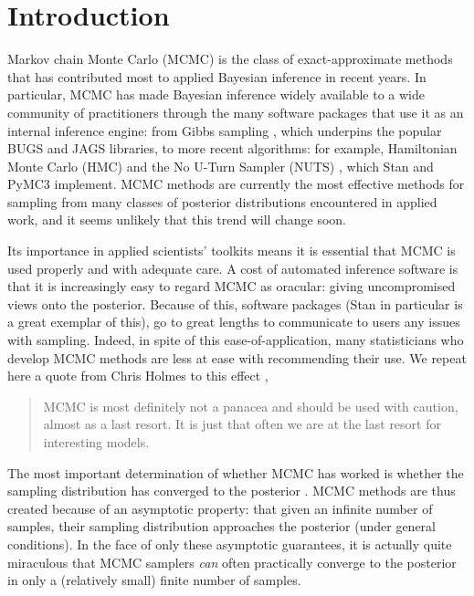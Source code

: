 \documentclass{article}
\begin{document}
\section{Introduction}
Markov chain Monte Carlo (MCMC) is the class of exact-approximate methods that has contributed most to applied Bayesian inference in recent years. In particular, MCMC has made Bayesian inference widely available to a wide community of practitioners through the many software packages that use it as an internal inference engine: from Gibbs sampling \cite{geman1984stochastic}, which underpins the popular BUGS \cite{lunn2000winbugs} and JAGS \cite{plummer2003jags} libraries, to more recent algorithms: for example, Hamiltonian Monte Carlo (HMC) \cite{neal2011mcmc} and the No U-Turn Sampler (NUTS) \cite{hoffman2014no}, which Stan \cite{carpenter2017stan} and PyMC3 \cite{salvatier2016probabilistic} implement. MCMC methods are currently the most effective methods for sampling from many classes of posterior distributions encountered in applied work, and it seems unlikely that this trend will change soon.

Its importance in applied scientists' toolkits means it is essential that MCMC is used properly and with adequate care. A cost of automated inference software is that it is increasingly easy to regard MCMC as oracular: giving uncompromised views onto the posterior. Because of this, software packages (Stan in particular \cite{carpenter2017stan} is a great exemplar of this), go to great lengths to communicate to users any issues with sampling. Indeed, in spite of this ease-of-application, many statisticians who develop MCMC methods are less at ease with recommending their use. We repeat here a quote from Chris Holmes to this effect \cite{holmes},

\begin{quote}
	MCMC is most definitely not a panacea and should be used with caution, almost as a last resort. It is just that often we are at the last resort for interesting models.
\end{quote}

The most important determination of whether MCMC has worked is whether the sampling distribution has converged to the posterior \cite{lambert2018Student}. MCMC methods are thus created because of an asymptotic property: that given an infinite number of samples, their sampling distribution approaches the posterior (under general conditions). In the face of only these asymptotic guarantees, it is actually quite miraculous that MCMC samplers \textit{can} often practically converge to the posterior in only a (relatively small) finite number of samples.
\end{document}
